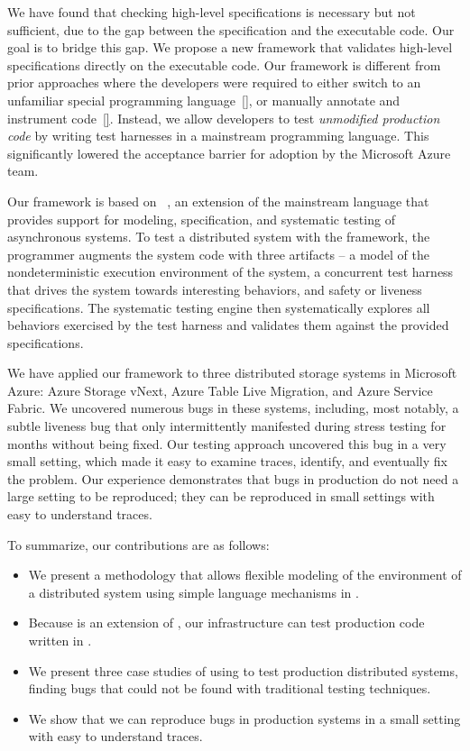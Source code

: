We have found that checking high-level specifications is necessary but not sufficient, due to the gap between the specification and the executable code.
Our goal is to bridge this gap. We propose a new framework that
validates high-level specifications directly
on the executable code. Our framework is different from prior
approaches where the developers were required to either switch to an
unfamiliar special programming language~\ref{}, or manually annotate
and instrument code~\ref{}. Instead, we allow developers to test
{\em unmodified production code} by writing test harnesses in a
mainstream programming language. This
significantly lowered the acceptance barrier for adoption by the
Microsoft Azure team.

Our framework is based on \psharp~\cite{deligiannis2015psharp}, an extension of the mainstream language \csharp that provides support for modeling, specification, and systematic testing of asynchronous systems.
To test a distributed system with the \psharp framework, the programmer augments the system code with three artifacts -- a model of the nondeterministic execution environment of the system, a concurrent test harness that drives the system towards interesting behaviors, and safety or liveness specifications.
The \psharp systematic testing engine then systematically explores all behaviors exercised by the test harness and validates them against the provided specifications.

We have applied our framework to three distributed storage systems in Microsoft Azure: Azure Storage vNext, Azure Table Live Migration, 
and Azure Service Fabric.
We uncovered numerous bugs in these systems, including, most notably, a subtle liveness bug that only intermittently 
manifested during stress testing for months without being fixed.
Our testing approach uncovered this bug in a very small setting, which made it easy to examine traces, identify, and eventually fix the problem.
Our experience demonstrates that bugs in production do not need a large setting to be reproduced;
they can be reproduced in small settings with easy to understand traces.

To summarize, our contributions are as follows:
\begin{itemize}
\item We present a methodology that allows flexible modeling of the environment of a distributed system using simple language mechanisms in \psharp.
\item Because \psharp is an extension of \csharp, our infrastructure can test production code written in \csharp.
\item We present three case studies of using \psharp to test production distributed systems, finding bugs that could not be found with traditional testing techniques.
\item We show that we can reproduce bugs in production systems in a small setting with easy to understand traces.
\end{itemize}

